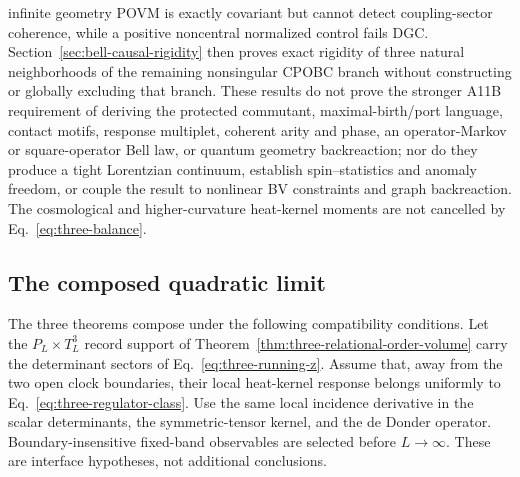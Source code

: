 infinite geometry POVM is exactly covariant but cannot detect
coupling-sector coherence, while a positive noncentral normalized control
fails DGC.  Section~\ref{sec:bell-causal-rigidity} then proves exact
rigidity of three natural neighborhoods of the remaining nonsingular CPOBC
branch without constructing or globally excluding that branch.  These
results do not prove the stronger A11B
requirement of deriving the protected commutant, maximal-birth/port language,
contact motifs, response multiplet, coherent arity and phase, an
operator-Markov or square-operator Bell law, or quantum geometry
backreaction; nor do they produce a tight
Lorentzian continuum, establish spin--statistics and anomaly freedom, or
couple the result to nonlinear BV constraints and graph backreaction.  The
cosmological and higher-curvature heat-kernel moments are not cancelled by
Eq.~\eqref{eq:three-balance}.

\subsection{The composed quadratic limit}

The three theorems compose under the following compatibility conditions.
Let the \(P_L\times T_L^3\) record support of
Theorem~\ref{thm:three-relational-order-volume} carry the determinant
sectors of Eq.~\eqref{eq:three-running-z}.  Assume that, away from the two
open clock boundaries, their local heat-kernel response belongs uniformly
to Eq.~\eqref{eq:three-regulator-class}.  Use the same local incidence
derivative in the scalar determinants, the symmetric-tensor kernel, and the
de Donder operator.  Boundary-insensitive fixed-band observables are
selected before \(L\to\infty\).  These are interface hypotheses, not
additional conclusions.

